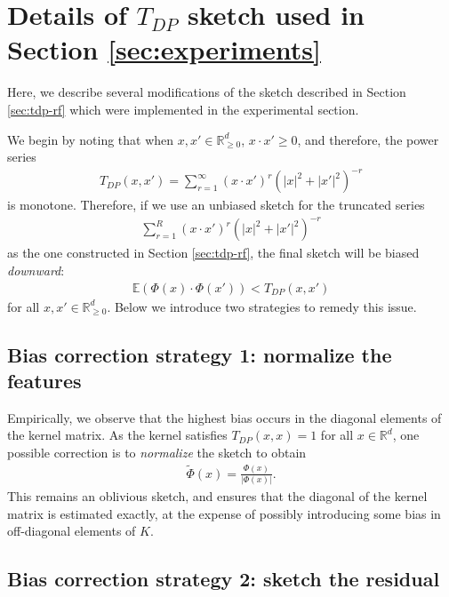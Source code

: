 \documentclass{article}
\theoremstyle{plain}
\theoremstyle{definition}
\theoremstyle{remark}
\newcommand{\eq}[1]{\begin{align*}#1\end{align*}}
\newcommand{\E}{\mathbb{E}}
\newcommand{\R}{\mathbb{R}}
\begin{document}
\section{Details of $T_{DP}$ sketch used in Section \ref{sec:experiments}}
\label{apdx:bias-correction}

Here, we describe several modifications of the sketch described in Section \ref{sec:tdp-rf} which were implemented in the experimental section. 

We begin by noting that when $x,x'\in\R_{\ge 0}^d$, $x\cdot x'\ge 0$, and therefore, the power series
\eq{
T_{DP}(x,x')=\sum_{r=1}^\infty (x\cdot x')^r(|x|^2+|x'|^2)^{-r}
}
is monotone. Therefore, if we use an unbiased sketch for the truncated series 
\eq{
\sum_{r=1}^R (x\cdot x')^r(|x|^2+|x'|^2)^{-r}
}
as the one constructed in Section \ref{sec:tdp-rf}, the final sketch will be biased \emph{downward}:
\eq{
\E(\Phi(x)\cdot\Phi(x'))< T_{DP}(x,x')
}
for all $x,x'\in\R_{\ge 0}^d$. Below we introduce two strategies to remedy this issue.

\subsection{Bias correction strategy 1: normalize the features}

Empirically, we observe that the highest bias occurs in the diagonal elements of the kernel matrix. As the kernel satisfies $T_{DP}(x,x)=1$ for all $x\in\R^d$, one possible correction is to \emph{normalize} the sketch to obtain
\eq{
\tilde \Phi(x) = \frac{\Phi(x)}{|\Phi(x)|}.
}
This remains an oblivious sketch, and ensures that the diagonal of the kernel matrix is estimated exactly, at the expense of possibly introducing some bias in off-diagonal elements of $K$.

\subsection{Bias correction strategy 2: sketch the residual}
\end{document}

